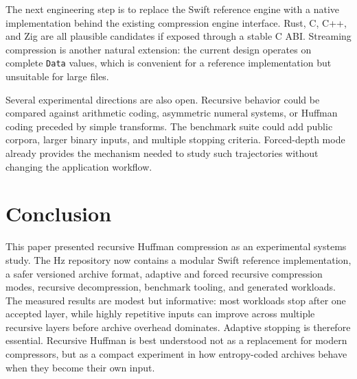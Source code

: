 \documentclass[conference]{IEEEtran}
\begin{document}
The next engineering step is to replace the Swift reference engine with a native implementation behind the existing compression engine interface. Rust, C, C++, and Zig are all plausible candidates if exposed through a stable C ABI. Streaming compression is another natural extension: the current design operates on complete \texttt{Data} values, which is convenient for a reference implementation but unsuitable for large files.

Several experimental directions are also open. Recursive behavior could be compared against arithmetic coding, asymmetric numeral systems, or Huffman coding preceded by simple transforms. The benchmark suite could add public corpora, larger binary inputs, and multiple stopping criteria. Forced-depth mode already provides the mechanism needed to study such trajectories without changing the application workflow.

\section{Conclusion}

This paper presented recursive Huffman compression as an experimental systems study. The Hz repository now contains a modular Swift reference implementation, a safer versioned archive format, adaptive and forced recursive compression modes, recursive decompression, benchmark tooling, and generated workloads. The measured results are modest but informative: most workloads stop after one accepted layer, while highly repetitive inputs can improve across multiple recursive layers before archive overhead dominates. Adaptive stopping is therefore essential. Recursive Huffman is best understood not as a replacement for modern compressors, but as a compact experiment in how entropy-coded archives behave when they become their own input.



\end{document}

